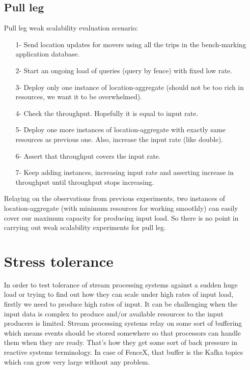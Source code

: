 \documentclass[a4]{report}
\begin{document}
    \subsection{Pull leg}
    Pull leg weak scalability evaluation scenario:
    \begin{itemize}
        \item[1-] Send location updates for movers using all the trips in the bench-marking application database.
        \item[2-] Start an ongoing load of queries (query by fence) with fixed low rate.
        \item[3-] Deploy only one instance of location-aggregate (should not be too rich in resources, we want it to
        be overwhelmed).
        \item[4-] Check the throughput.
        Hopefully it is equal to input rate.
        \item[5-] Deploy one more instances of location-aggregate with exactly same resources as previous one.
        Also, increase the input rate (like double).
        \item[6-] Assert that throughput covers the input rate.
        \item[7-] Keep adding instances, increasing input rate and asserting increase in throughput until throughput
        stops increasing.
    \end{itemize}

    Relaying on the observations from previous experiments, two instances of location-aggregate (with minimum
    resources for working smoothly) can easily cover our maximum capacity for producing input load.
    So there is no point in carrying out weak scalability experiments for pull leg.


    \section{Stress tolerance}
    In order to test tolerance of stream processing systems against a sudden huge load or trying to find out how
    they can scale under high rates of input load, firstly we need to produce high rates of input.
    It can be challenging when the input data is complex to produce and/or available resources to the input producers
    is limited.
    Stream processing systems relay on some sort of buffering which means events should be stored somewhere so
    that processors can handle them when they are ready.
    That's how they get some sort of back pressure in reactive systems terminology.
    In case of FenceX, that buffer is the Kafka topics which can grow very large without any problem.
\end{document}
